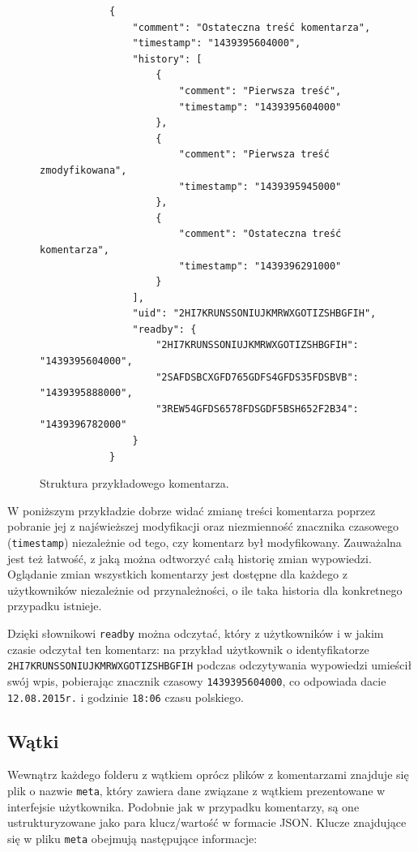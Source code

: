 \documentclass[polish,a4paper,twoside]{ppfcmthesis}
\begin{document}
\begin{figure}[t]
  \label{rys:comment}
  \begin{verbatim}
            {
                "comment": "Ostateczna treść komentarza", 
                "timestamp": "1439395604000", 
                "history": [
                    {
                        "comment": "Pierwsza treść", 
                        "timestamp": "1439395604000"
                    },
                    {
                        "comment": "Pierwsza treść zmodyfikowana", 
                        "timestamp": "1439395945000"
                    },
                    {
                        "comment": "Ostateczna treść komentarza", 
                        "timestamp": "1439396291000"
                    }
                ], 
                "uid": "2HI7KRUNSSONIUJKMRWXGOTIZSHBGFIH", 
                "readby": {
                    "2HI7KRUNSSONIUJKMRWXGOTIZSHBGFIH": "1439395604000",
                    "2SAFDSBCXGFD765GDFS4GFDS35FDSBVB": "1439395888000",
                    "3REW54GFDS6578FDSGDF5BSH652F2B34": "1439396782000"
                }
            }
  \end{verbatim}
  \caption{Struktura przykładowego komentarza.}
\end{figure}

W poniższym przykładzie dobrze widać zmianę treści komentarza poprzez pobranie jej z najświeższej modyfikacji oraz niezmienność znacznika czasowego (\texttt{timestamp}) niezależnie od tego, czy komentarz był modyfikowany. Zauważalna jest też łatwość, z jaką można odtworzyć całą historię zmian wypowiedzi. Oglądanie zmian wszystkich komentarzy jest dostępne dla każdego z użytkowników niezależnie od przynależności, o ile taka historia dla konkretnego przypadku istnieje.

Dzięki słownikowi \texttt{readby} można odczytać, który z użytkowników i w jakim czasie odczytał ten komentarz: na przykład użytkownik o identyfikatorze \texttt{2HI7KRUN\-SSONIUJ\-KMRWXGOTI\-ZSHBGFIH} podczas odczytywania wypowiedzi umieścił swój wpis, pobierając znacznik czasowy \texttt{1439395604000}, co odpowiada dacie \texttt{12.08.2015r.} i godzinie \texttt{18:06} czasu polskiego.

\subsection{Wątki}

Wewnątrz każdego folderu z wątkiem oprócz plików z komentarzami znajduje się plik o nazwie \texttt{meta}, który zawiera dane związane z wątkiem prezentowane w interfejsie użytkownika. Podobnie jak w przypadku komentarzy, są one ustrukturyzowane jako para klucz/wartość w formacie JSON. Klucze znajdujące się w pliku \texttt{meta} obejmują następujące informacje:
\end{document}
